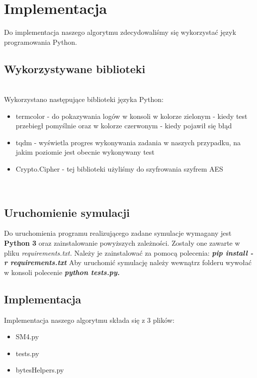 \newpage
\section{Implementacja}
Do implementacja naszego algorytmu zdecydowaliśmy się wykorzystać język programowania Python.\\

\subsection{ Wykorzystywane biblioteki }\\

Wykorzystano następujące biblioteki języka Python: \\
\begin{itemize}
    \item termcolor - do pokazywania logów w konsoli w kolorze zielonym - kiedy test przebiegł pomyślnie oraz w kolorze czerwonym - kiedy pojawił się błąd
    \item tqdm - wyświetla progres wykonywania zadania w naszych przypadku, na jakim poziomie jest obecnie wykonywany test
    \item Crypto.Cipher - tej biblioteki użyliśmy do szyfrowania szyfrem AES
\end{itemize}\\


\subsection{ Uruchomienie symulacji  }
Do uruchomienia programu realizującego zadane symulacje wymagany jest \textbf{Python 3} oraz zainstalowanie powyższych zależności. Zostały one zawarte w pliku \textit{requirements.txt.} Należy je zainstalować za pomocą polecenia: \textbf{\textit{pip install -r requirements.txt}} Aby uruchomić symulację należy wewnątrz folderu wywołać w konsoli polecenie \textbf{\textit{python tests.py.}}\\

\subsection{ Implementacja  }
Implementacja naszego algorytmu składa się z 3 plików:\\
\begin{itemize}
    \item SM4.py
    \item tests.py 
    \item bytesHelpers.py
\end{itemize}\\

